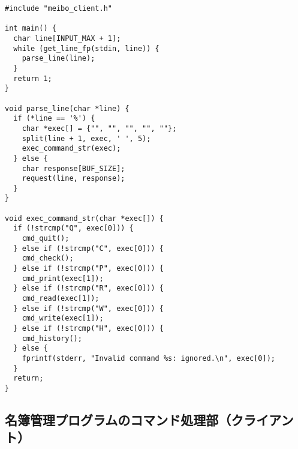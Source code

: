 \documentclass[11pt]{jsarticle}
\begin{document}
\begin{verbatim}
#include "meibo_client.h"

int main() {
  char line[INPUT_MAX + 1];
  while (get_line_fp(stdin, line)) {
    parse_line(line);
  }
  return 1;
}

void parse_line(char *line) {
  if (*line == '%') {
    char *exec[] = {"", "", "", "", ""};
    split(line + 1, exec, ' ', 5);
    exec_command_str(exec);
  } else {
    char response[BUF_SIZE];
    request(line, response);
  }
}

void exec_command_str(char *exec[]) {
  if (!strcmp("Q", exec[0])) {
    cmd_quit();
  } else if (!strcmp("C", exec[0])) {
    cmd_check();
  } else if (!strcmp("P", exec[0])) {
    cmd_print(exec[1]);
  } else if (!strcmp("R", exec[0])) {
    cmd_read(exec[1]);
  } else if (!strcmp("W", exec[0])) {
    cmd_write(exec[1]);
  } else if (!strcmp("H", exec[0])) {
    cmd_history();
  } else {
    fprintf(stderr, "Invalid command %s: ignored.\n", exec[0]);
  }
  return;
}

\end{verbatim}

\subsection{名簿管理プログラムのコマンド処理部（クライアント）} \label{sec:commands.c}
\end{document}
